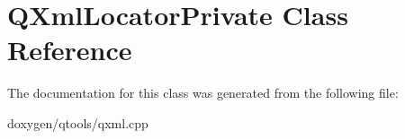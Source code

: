 \hypertarget{class_q_xml_locator_private}{}\section{Q\+Xml\+Locator\+Private Class Reference}
\label{class_q_xml_locator_private}


The documentation for this class was generated from the following file\+:\begin{DoxyCompactItemize}
\item 
doxygen/qtools/qxml.\+cpp\end{DoxyCompactItemize}
